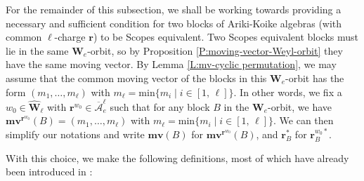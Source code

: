 \documentclass[11pt,a4paper,reqno]{amsart}
\numberwithin{equation}{section}
\theoremstyle{plain}
\theoremstyle{definition}
\theoremstyle{remark}
\numberwithin{equation}{section}
\newcommand{\br}{\mathbf{r}}
\newcommand{\mv}{\mathbf{mv}}
\renewcommand{\min}{\mathrm{min}}
\newcommand{\EW}{\widehat{\mathbf{W}}}
\newcommand{\AW}{\mathbf{W}}
\newcommand{\AAbar}{\overline{\mathcal{A}}_e^{\ell}}
\begin{document}
For the remainder of this subsection, we shall be working towards providing a necessary and sufficient condition for two blocks of Ariki-Koike algebras (with common $\ell$-charge $\br$) to be Scopes equivalent.
Two Scopes equivalent blocks must lie in the same $\AW_e$-orbit, so by Proposition \ref{P:moving-vector-Weyl-orbit} they have the same moving vector.
By Lemma \ref{L:mv-cyclic permutation}, we may assume that the common moving vector of the blocks in this $\AW_e$-orbit has the form $(m_1,\dotsc, m_{\ell})$ with $m_{\ell} = \min \{ m_i \mid i \in [1,\,\ell] \}$.
In other words, we fix a $w_0 \in \EW_{\ell}$ with $\br^{w_0} \in \AAbar$ such that for any block $B$ in the $\AW_e$-orbit, we have $\mv^{\br^{w_0}}(B) = (m_1,\dotsc, m_{\ell})$ with $m_{\ell} = \min \{ m_i \mid i \in [1,\,\ell] \}$.
We can then simplify our notations and write $\mv(B)$ for $\mv^{\br^{w_0}}(B)$, and $\br^*_B$ for $\br^{w_0*}_B$.

With this choice, we make the following definitions, most of which have already been introduced in \cite[Section 4]{LQT}:
\end{document}
